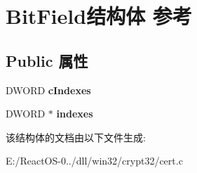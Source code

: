 \hypertarget{struct_bit_field}{}\section{Bit\+Field结构体 参考}
\label{struct_bit_field}
\subsection*{Public 属性}
\begin{DoxyCompactItemize}
\item 
\mbox{\label{struct_bit_field_a78a4f9fd111ee7ea3029051e99486cff}} 
D\+W\+O\+RD {\bfseries c\+Indexes}
\item 
\mbox{\label{struct_bit_field_ab8ba6fd1f239a5aeb5137ef08d8f4ab9}} 
D\+W\+O\+RD $\ast$ {\bfseries indexes}
\end{DoxyCompactItemize}


该结构体的文档由以下文件生成\+:\begin{DoxyCompactItemize}
\item 
E\+:/\+React\+O\+S-\/0../dll/win32/crypt32/cert.\+c\end{DoxyCompactItemize}

